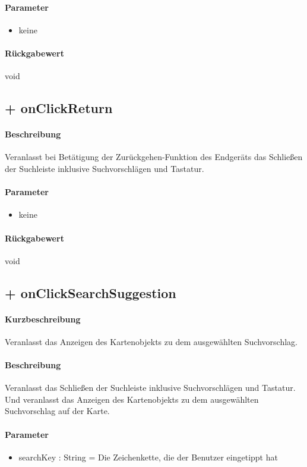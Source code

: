 \paragraph*{Parameter}
\begin{itemize}
    \item keine
\end{itemize}
\paragraph*{Rückgabewert}
void

\subsection{+ onClickReturn}%
\paragraph*{Beschreibung}
Veranlasst bei Betätigung der Zurückgehen-Funktion des Endgeräts das Schließen der Suchleiste inklusive Suchvorschlägen und Tastatur.
\paragraph*{Parameter}
\begin{itemize}
    \item keine
\end{itemize}
\paragraph*{Rückgabewert}
void

\subsection{+ onClickSearchSuggestion}%
\paragraph*{Kurzbeschreibung}
Veranlasst das Anzeigen des Kartenobjekts zu dem ausgewählten Suchvorschlag.
\paragraph*{Beschreibung}
Veranlasst das Schließen der Suchleiste inklusive Suchvorschlägen und Tastatur.
Und veranlasst das Anzeigen des Kartenobjekts zu dem ausgewählten Suchvorschlag auf der Karte.
\paragraph*{Parameter}
\begin{itemize}
    \item searchKey : String = Die Zeichenkette, die der Benutzer eingetippt hat
\end{itemize}
